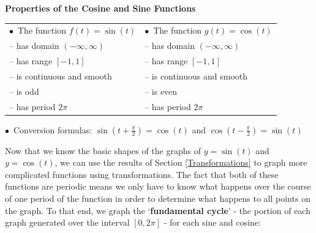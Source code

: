 \documentclass{ximera}
\begin{document}
\begin{theorem} \label{cosinesinefunctionprops}  \textbf{Properties of the Cosine and Sine Functions}  

\begin{tabular}{ll}

 $\bullet \, $ The function $f(t) = \sin(t)$ &  $\bullet \, $ The function $g(t) = \cos(t)$ \\

\qquad -- has domain $(-\infty, \infty)$ & \qquad -- has domain $(-\infty, \infty)$ \\

\qquad -- has range $[-1,1]$ & \qquad  -- has range $[-1,1]$ \\
\qquad  -- is continuous and smooth &  \qquad -- is continuous and smooth \\ 
\qquad -- is odd &  \qquad  -- is  even \\ 
\qquad  -- has period $2\pi$ & \qquad -- has period $2\pi$ \\ 

\end{tabular}



\qquad $\bullet \, $ Conversion formulas:  $\sin\left(t + \frac{\pi}{2}\right) = \cos(t)$ and   $\cos\left(t - \frac{\pi}{2} \right) = \sin(t)$



\end{theorem}




Now that we know the basic shapes of the graphs of $y = \sin(t)$ and $y = \cos(t)$, we can use the results of Section \ref{Transformations} to graph more complicated functions using transformations.  The fact that both of these functions are periodic means we only have to know what happens over the course of one period of the function in order to determine what happens to all points on the graph.  To that end, we graph the `\textbf{fundamental cycle}'  - the portion of each graph generated over the interval $[0, 2\pi]$ - for each  sine and cosine:
\end{document}
